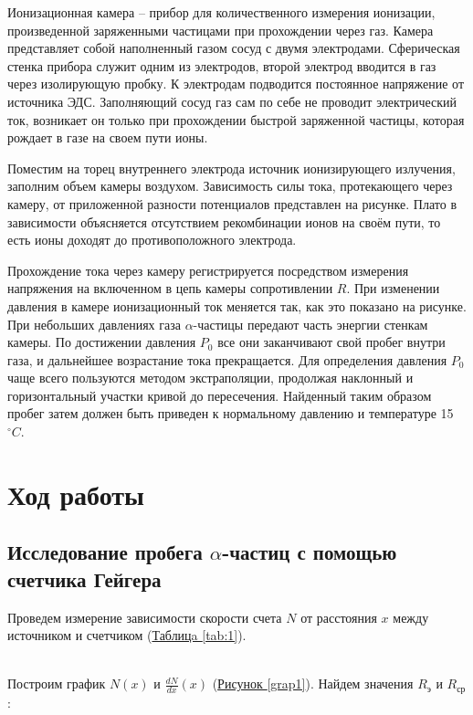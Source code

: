 \documentclass{article}
\begin{document}
    Ионизационная камера -- прибор для количественного измерения ионизации, произведенной заряженными частицами при прохождении
    через газ. Камера представляет собой наполненный газом сосуд с двумя электродами. Сферическая стенка прибора служит одним из электродов, второй электрод вводится в газ через изолирующую пробку. К электродам подводится постоянное напряжение от источника ЭДС.
    Заполняющий сосуд газ сам по себе не проводит электрический ток, возникает он только при прохождении быстрой заряженной частицы, которая
    рождает в газе на своем пути ионы.

    Поместим на торец внутреннего электрода источник ионизирующего излучения, заполним объем камеры воздухом. Зависимость силы тока, протекающего через камеру, от приложенной разности потенциалов представлен на рисунке. Плато в зависимости объясняется отсутствием рекомбинации ионов на своём пути, то есть ионы доходят до противоположного электрода.

    Прохождение тока через камеру регистрируется посредством измерения напряжения на включенном в цепь камеры сопротивлении $R$. При изменении давления в камере ионизационный ток меняется так, как это показано на рисунке. При небольших давлениях газа $\alpha$-частицы передают часть энергии стенкам камеры. По достижении давления $P_0$ все они заканчивают свой пробег внутри газа, и дальнейшее возрастание тока прекращается. Для определения давления $P_0$ чаще всего пользуются методом экстраполяции, продолжая наклонный и горизонтальный участки кривой до пересечения. Найденный таким образом пробег затем должен быть приведен к нормальному давлению и температуре 15 $^\circ C$.


\section{Ход работы}




\subsection{Исследование пробега $\alpha$-частиц с помощью счетчика Гейгера}
	
Проведем измерение зависимости скорости счета $N$ от расстояния $x$ между источником и счетчиком (\hyperref[tab:1]{Таблицa \ref*{tab:1}}).

\\
Построим график $N(x)$ и $\frac{dN}{dx}(x)$  (\hyperref[grap1]{Рисунок \ref*{grap1}}). Найдем значения $R_\text{э}$ и $R_\text{ср}$:
   
\end{document}
